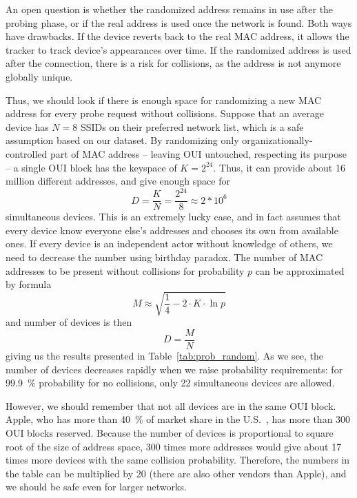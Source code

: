 \documentclass[12pt,a4paper,oneside,pdftex]{report}
\begin{document}
An open question is whether the randomized address remains in use after the probing phase, or if the real address is used once the network is found. Both ways have drawbacks. If the device reverts back to the real MAC address, it allows the tracker to track device's appearances over time. If the randomized address is used after the connection, there is a risk for collisions, as the address is not anymore globally unique.

Thus, we should look if there is enough space for randomizing a new MAC address for every probe request without collisions. Suppose that an average device has $N = 8$ SSIDs on their preferred network list, which is a safe assumption based on our dataset. By randomizing only organizationally-controlled part of MAC address -- leaving OUI untouched, respecting its purpose -- a single OUI block has the keyspace of $K=2^{24}$. Thus, it can provide about 16 million different addresses, and give enough space for
$$D = \frac{K}{N} = \frac{2^{24}}{8} \approx 2*10^6$$
simultaneous devices. This is an extremely lucky case, and in fact assumes that every device know everyone else's addresses and chooses its own from available ones. If every device is an independent actor without knowledge of others, we need to decrease the number using birthday paradox. The number of MAC addresses to be present without collisions for probability $p$ can be approximated by formula~\cite{mathis1991generalized}
$$M \approx \sqrt{\frac{1}{4} - 2 \cdot K \cdot \ln p}$$ 
and number of devices is then
$$D = \frac{M}{N}$$
giving us the results presented in Table~\ref{tab:prob_random}. As we see, the number of devices decreases rapidly when we raise probability requirements: for 99.9~\% probability for no collisions, only 22 simultaneous devices are allowed.

However, we should remember that not all devices are in the same OUI block. Apple, who has more than 40~\% of market share in the U.S.~\cite{comscore2014}, has more than 300 OUI blocks reserved. Because the number of devices is proportional to square root of the size of address space, 300 times more addresses would give about 17 times more devices with the same collision probability. Therefore, the numbers in the table can be multiplied by 20 (there are also other vendors than Apple), and we should be safe even for larger networks.
\end{document}
